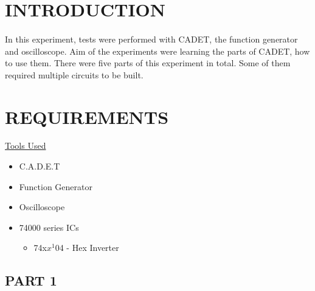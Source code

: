 \documentclass[pdftex,12pt,a4paper]{article}
\begin{document}
\setcounter{page}{1}
\section{INTRODUCTION }

\begin{flushleft}
\paragraph{}
In this experiment, tests were performed with CADET, the function generator and oscilloscope. Aim of the experiments were learning the parts of CADET, how to use them. There were five parts of this experiment in total. Some of them required multiple circuits to be built.
\end{flushleft}
\section{REQUIREMENTS }

\begin{flushleft}
\underline{Tools Used}
\end{flushleft}
\begin{itemize}
    \item C.A.D.E.T
    \item Function Generator
    \item Oscilloscope
    \item 74000 series ICs
    \begin{itemize}
        \item 74x$x^{1}$04 - Hex Inverter
    \end{itemize}
\end{itemize}

\begin{flushleft}
\subsection{PART 1}
\end{flushleft}
\end{document}

